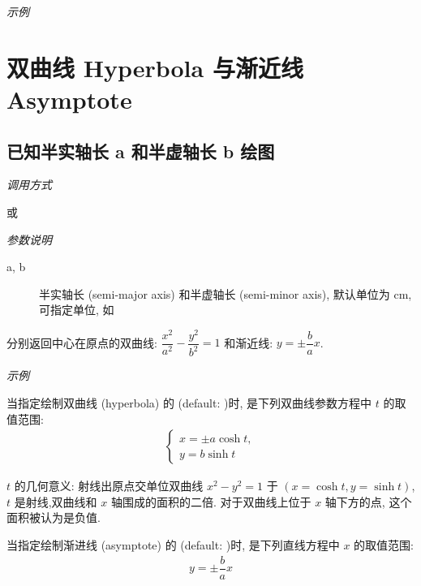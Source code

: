 \emph{示例}


\section{双曲线 Hyperbola 与渐近线 Asymptote}

\subsection{已知半实轴长 a 和半虚轴长 b 绘图}

\emph{调用方式}

\begin{tcolorbox}{}
\end{tcolorbox}

或

\begin{tcolorbox}{}
\end{tcolorbox}

\emph{参数说明}

\begin{description}
  \item[a, b] 半实轴长 (semi-major axis) 和半虚轴长 (semi-minor axis), 默认单位为 cm, 可指定单位, 如 \verbum{(4cm, 3cm)}
\end{description}

分别返回中心在原点的双曲线: $\dfrac{x^2}{a^2}-\dfrac{y^2}{b^2}=1$ 和渐近线: $y = \pm \dfrac{b}{a}x$.

\emph{示例}


\begin{remark*}
当指定绘制双曲线 (hyperbola) 的  (default: )时,  是下列双曲线参数方程中 $t$ 的取值范围:
\begin{align*}
  \begin{cases}
  x = \pm a \cosh t,\\y = b \sinh t
  \end{cases}
\end{align*}

$t$ 的几何意义: 射线出原点交单位双曲线 $x^2-y^2=1$ 于 $(x = \cosh t, y = \sinh t)$,
$t$ 是射线,双曲线和 $x$ 轴围成的面积的二倍. 对于双曲线上位于 $x$ 轴下方的点, 这个面积被认为是负值.

当指定绘制渐进线 (asymptote) 的  (default: )时,  是下列直线方程中 $x$ 的取值范围:
\begin{align*}
  y = \pm \dfrac{b}{a} x
\end{align*}
\end{remark*}

